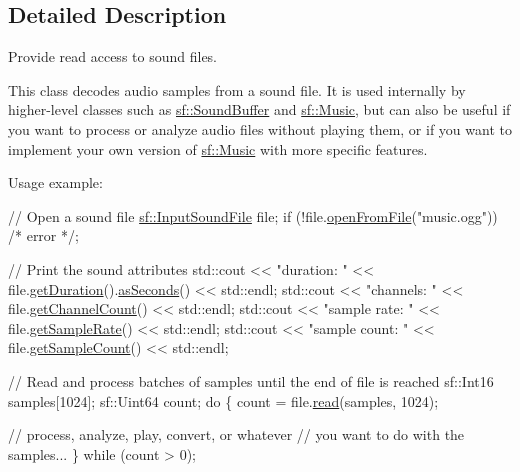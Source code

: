 \subsection{Detailed Description}
Provide read access to sound files. 

This class decodes audio samples from a sound file. It is used internally by higher-\/level classes such as \hyperlink{classsf_1_1_sound_buffer}{sf\+::\+Sound\+Buffer} and \hyperlink{classsf_1_1_music}{sf\+::\+Music}, but can also be useful if you want to process or analyze audio files without playing them, or if you want to implement your own version of \hyperlink{classsf_1_1_music}{sf\+::\+Music} with more specific features.

Usage example\+: 
\begin{DoxyCode}
\textcolor{comment}{// Open a sound file}
\hyperlink{classsf_1_1_input_sound_file}{sf::InputSoundFile} file;
\textcolor{keywordflow}{if} (!file.\hyperlink{classsf_1_1_input_sound_file_af68e54bc9bfac19554c84601156fe93f}{openFromFile}(\textcolor{stringliteral}{"music.ogg"}))
    \textcolor{comment}{/* error */};

\textcolor{comment}{// Print the sound attributes}
std::cout << \textcolor{stringliteral}{"duration: "} << file.\hyperlink{classsf_1_1_input_sound_file_aa081bd4d9732408d10b48227a360778e}{getDuration}().\hyperlink{classsf_1_1_time_aa3df2f992d0b0041b4eb02258d43f0e3}{asSeconds}() << std::endl;
std::cout << \textcolor{stringliteral}{"channels: "} << file.\hyperlink{classsf_1_1_input_sound_file_a54307c308ba05dea63aba54a29c804a4}{getChannelCount}() << std::endl;
std::cout << \textcolor{stringliteral}{"sample rate: "} << file.\hyperlink{classsf_1_1_input_sound_file_a6b8177e40dd8020752f6d52f96b774c3}{getSampleRate}() << std::endl;
std::cout << \textcolor{stringliteral}{"sample count: "} << file.\hyperlink{classsf_1_1_input_sound_file_a665b7fed6cdca3e0c622909e5a6655e4}{getSampleCount}() << std::endl;

\textcolor{comment}{// Read and process batches of samples until the end of file is reached}
sf::Int16 samples[1024];
sf::Uint64 count;
\textcolor{keywordflow}{do}
\{
    count = file.\hyperlink{classsf_1_1_input_sound_file_a83d6f64617456601edeb0daf9d14a17f}{read}(samples, 1024);

    \textcolor{comment}{// process, analyze, play, convert, or whatever}
    \textcolor{comment}{// you want to do with the samples...}
\}
\textcolor{keywordflow}{while} (count > 0);
\end{DoxyCode}



